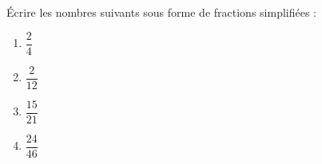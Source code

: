 
\begin{exercice}\label{exosmath-0855}

    Écrire les nombres suivants sous forme de fractions simplifiées :
    \begin{multicols}{2}
        \begin{enumerate}
            \item
                \( \dfrac{ 2 }{ 4 }\)
            \item
                \( \dfrac{ 2 }{ 12 }\)
            \item
                \( \dfrac{ 15 }{ 21 }\)
            \item
                \( \dfrac{ 24 }{ 46 }\)
        \end{enumerate}
    \end{multicols}

\end{exercice}
